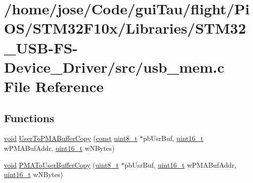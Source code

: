\hypertarget{_s_t_m32_f10x_2_libraries_2_s_t_m32___u_s_b-_f_s-_device___driver_2src_2usb__mem_8c}{\section{/home/jose/\-Code/gui\-Tau/flight/\-Pi\-O\-S/\-S\-T\-M32\-F10x/\-Libraries/\-S\-T\-M32\-\_\-\-U\-S\-B-\/\-F\-S-\/\-Device\-\_\-\-Driver/src/usb\-\_\-mem.c File Reference}
\label{_s_t_m32_f10x_2_libraries_2_s_t_m32___u_s_b-_f_s-_device___driver_2src_2usb__mem_8c}
}
\subsection*{Functions}
\begin{DoxyCompactItemize}
\item 
\hyperlink{group___n_a_m_e_ga18028b8badbf1ea7e704ccac3c488e82}{void} \hyperlink{_s_t_m32_f10x_2_libraries_2_s_t_m32___u_s_b-_f_s-_device___driver_2src_2usb__mem_8c_a7e80055e83c3a7bf6229e0ff48c8bbc5}{User\-To\-P\-M\-A\-Buffer\-Copy} (\hyperlink{group___n_a_m_e_ga7ae6d0e43244213b34de2c2b9aa30da6}{const} \hyperlink{stdint_8h_aba7bc1797add20fe3efdf37ced1182c5}{uint8\-\_\-t} $\ast$pb\-Usr\-Buf, \hyperlink{stdint_8h_a273cf69d639a59973b6019625df33e30}{uint16\-\_\-t} w\-P\-M\-A\-Buf\-Addr, \hyperlink{stdint_8h_a273cf69d639a59973b6019625df33e30}{uint16\-\_\-t} w\-N\-Bytes)
\item 
\hyperlink{group___n_a_m_e_ga18028b8badbf1ea7e704ccac3c488e82}{void} \hyperlink{_s_t_m32_f10x_2_libraries_2_s_t_m32___u_s_b-_f_s-_device___driver_2src_2usb__mem_8c_ab6dd9414600ffbf779acfc5266f59353}{P\-M\-A\-To\-User\-Buffer\-Copy} (\hyperlink{stdint_8h_aba7bc1797add20fe3efdf37ced1182c5}{uint8\-\_\-t} $\ast$pb\-Usr\-Buf, \hyperlink{stdint_8h_a273cf69d639a59973b6019625df33e30}{uint16\-\_\-t} w\-P\-M\-A\-Buf\-Addr, \hyperlink{stdint_8h_a273cf69d639a59973b6019625df33e30}{uint16\-\_\-t} w\-N\-Bytes)
\end{DoxyCompactItemize}



